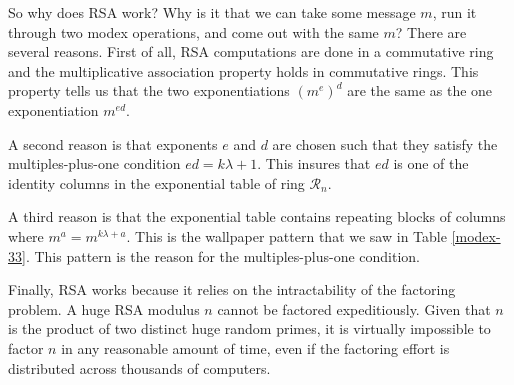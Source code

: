 
So why does RSA work?
Why is it that we can take some message $m$,
run it through two modex operations, and come out with the same $m$?
There are several reasons.
First of all, RSA computations are done in a commutative ring
and the multiplicative association property holds in commutative rings.
This property tells us that 
the two exponentiations $(m^e)^d$ are the same as the one exponentiation $m^{ed}$.

A second reason is that exponents $e$ and $d$ are chosen
such that they satisfy the multiples-plus-one condition $ed = k\lambda + 1$.
This insures that $ed$ is one of the identity columns
in the exponential table of ring $\mathcal{R}_n$.

A third reason is that the exponential table contains 
repeating blocks of columns where $m^a=m^{k\lambda+a}$.
This is the wallpaper pattern that we saw in Table \ref{modex-33}.
This pattern is the reason for the multiples-plus-one condition.

Finally, RSA works because it relies on the intractability of the factoring problem.
A huge RSA modulus $n$ cannot be factored expeditiously.
Given that $n$ is the product of two distinct huge random primes,
it is virtually impossible to factor $n$ in any reasonable amount of time,
even if the factoring effort is distributed across thousands of computers.


